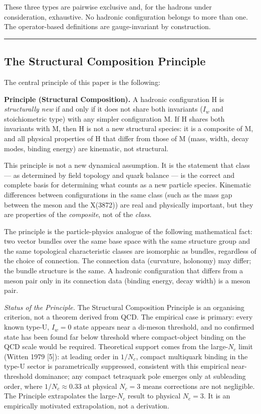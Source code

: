 These three types are pairwise exclusive and, for the hadrons under
consideration, exhaustive. No hadronic configuration belongs to more
than one. The operator-based definitions are gauge-invariant by
construction.

\begin{center}\rule{0.5\linewidth}{0.5pt}\end{center}

\hypertarget{the-structural-composition-principle}{%
\subsection{The Structural Composition
Principle}\label{the-structural-composition-principle}}

The central principle of this paper is the following:

\textbf{Principle (Structural Composition).} A hadronic configuration H
is \emph{structurally new} if and only if it does not share both
invariants (\(I_w\) and stoichiometric type) with any simpler
configuration M. If H shares both invariants with M, then H is not a new
structural species: it is a composite of M, and all physical properties
of H that differ from those of M (mass, width, decay modes, binding
energy) are kinematic, not structural.

This principle is not a new dynamical assumption. It is the statement
that class --- as determined by field topology and quark
balance --- is the correct and complete basis for determining what
counts as a new particle species. Kinematic differences between
configurations in the same class (such as the mass gap
between the meson and the X(3872)) are real and physically important,
but they are properties of the \emph{composite}, not of the
\emph{class}.

The principle is the particle-physics analogue of the following
mathematical fact: two vector bundles over the same base space with the
same structure group and the same topological characteristic classes are
isomorphic as bundles, regardless of the choice of connection. The
connection data (curvature, holonomy) may differ; the bundle structure
is the same. A hadronic configuration that differs from a meson pair
only in its connection data (binding energy, decay width) is a meson
pair.

\emph{Status of the Principle.} The Structural Composition Principle is
an organising criterion, not a theorem derived from QCD. The empirical
case is primary: every known type-U, \(I_w = 0\) state appears near a
di-meson threshold, and no confirmed state has been found far below
threshold where compact-object binding on the QCD scale would be
required. Theoretical support comes from the large-\(N_c\) limit (Witten
1979 {[}5{]}): at leading order in \(1/N_c\), compact multiquark binding
in the type-U sector is parametrically suppressed, consistent with this
empirical near-threshold dominance; any compact tetraquark pole emerges
only at subleading order, where \(1/N_c \approx 0.33\) at physical
\(N_c = 3\) means corrections are not negligible. The Principle
extrapolates the large-\(N_c\) result to physical \(N_c = 3\). It is an
empirically motivated extrapolation, not a derivation.

